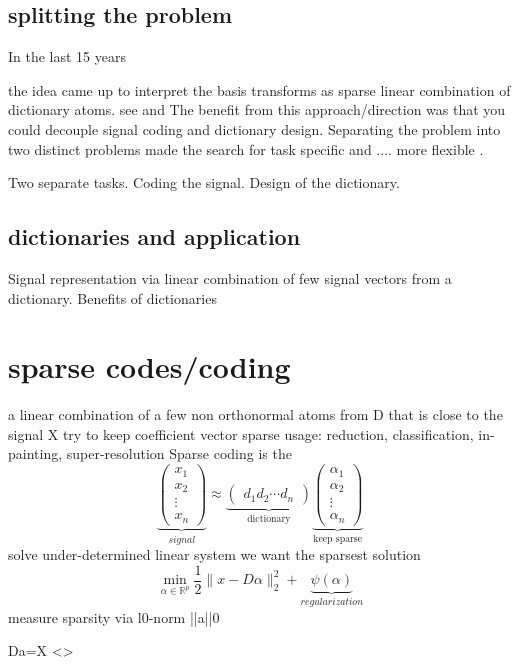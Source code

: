 \subsection{splitting the problem}
In the last 15 years 

the idea came up to interpret the basis transforms as sparse linear combination of dictionary atoms.
see \cite{Olshausen Field 1997} and \cite{}
The benefit from this approach/direction was that you could decouple signal coding and dictionary design.
Separating the problem into two distinct problems made the search for task specific and .... more flexible \cite{?}.

Two separate tasks.
Coding the signal. Design of the dictionary.

\subsection{dictionaries and application}
Signal representation via linear combination of few signal vectors from a dictionary.
Benefits of dictionaries


\section{sparse codes/coding}
a linear combination of a few non orthonormal atoms from
D that is close to the signal X
try to keep coefficient vector sparse
usage: reduction, classification, in-painting,  super-resolution
Sparse coding is the 
\[
\underbrace{\begin{pmatrix} x_1 \\ x_2 \\ \vdots \\ x_n \end{pmatrix}}_{signal} \approx \underbrace{\begin{pmatrix} d_1  d_2 \cdots d_n \end{pmatrix}}_{\textrm{dictionary}}
\underbrace{\begin{pmatrix} \alpha_1 \\ \alpha_2 \\ \vdots \\ \alpha_n \end{pmatrix}}_{\textrm{keep sparse}}
\]
solve under-determined linear system
we want the sparsest solution
\[
\min_{\alpha\in\mathbb{R}^{p}} \frac{1}{2} \lVert x - D\alpha \rVert^{2}_{2} + \underbrace{\psi(\alpha)}_{regularization}
\] 
measure sparsity via       l0-norm       ||a||0

Da=X
<>

